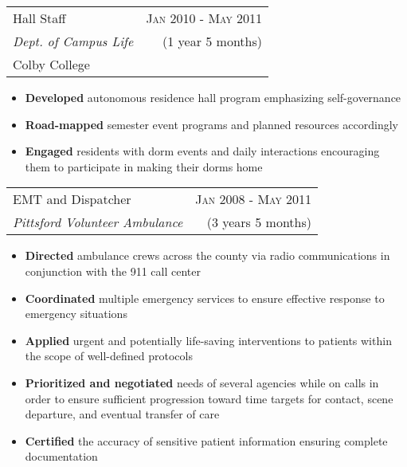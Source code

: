 \documentclass[10pt]{article} %
\begin{document}
{\begin{minipage}[t]{0.5\textwidth}
\begin{tabularx}{\linewidth}{ X r }
  {\large Hall Staff } & {\textsc{Jan 2010 - May 2011}} \\
  {\small{\textit{Dept. of Campus Life}}} & {\small{(1 year 5 months)}} \\
  {\small{Colby College}} 
\end{tabularx}
\begin{itemize}
  \item \textbf{Developed} autonomous residence hall program emphasizing self-governance
  \item \textbf{Road-mapped} semester event programs and planned resources accordingly
  \item \textbf{Engaged} residents with dorm events and daily interactions encouraging them to participate in making their dorms home
\end{itemize}


\begin{tabularx}{\linewidth}{ X r }
  {\large EMT and Dispatcher } & {\textsc{Jan 2008 - May 2011}} \\
  {\small\textit{Pittsford Volunteer Ambulance}} & {\small{(3 years 5 months)}}
\end{tabularx}
\begin{itemize}
  \item \textbf{Directed} ambulance crews across the county via radio communications in conjunction with the 911 call center
  \item \textbf{Coordinated} multiple emergency services to ensure effective response to emergency situations
  \item \textbf{Applied} urgent and potentially life-saving interventions to patients within the scope of well-defined protocols
\item \textbf{Prioritized and negotiated} needs of several agencies while on calls in order to ensure sufficient progression toward time targets for contact, scene departure, and eventual transfer of care
  \item \textbf{Certified} the accuracy of sensitive patient information ensuring complete documentation
\end{itemize}



\end{minipage}}
\end{document}
